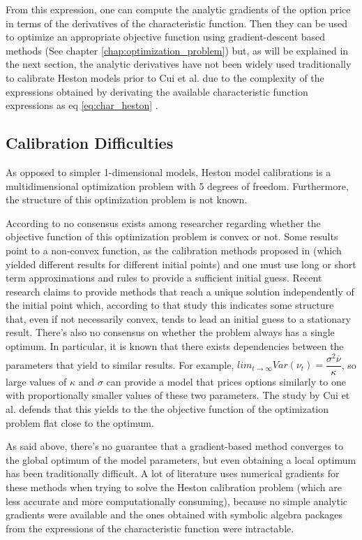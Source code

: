 \documentclass[12,twoside]{mammeTFM}
\theoremstyle{definition}
\theoremstyle{remark}
\begin{document}
From this expression, one can compute the analytic gradients of the option price in terms of the derivatives of the characteristic function. Then they can be used to optimize an appropriate objective function using gradient-descent based methods (See chapter \ref{chap:optimization_problem}) but, as will be explained in the next section, the analytic derivatives have not been widely used traditionally to calibrate Heston models prior to Cui et al. due to the complexity of the expressions obtained by derivating the available characteristic function expressions as eq \ref{eq:char_heston}  \cite{cui17}.

\subsection{Calibration Difficulties} \label{subsec:calibration_difficulties}
As opposed to simpler 1-dimensional models, Heston model calibrations is a multidimensional optimization problem with 5 degrees of freedom. Furthermore, the structure of this optimization problem is not known.

According to \cite{cui17} no consensus exists among researcher regarding whether the objective function of this optimization problem is convex or not. Some results point to a non-convex function, as the calibration methods proposed in \cite{che07, mik03} (which yielded different results for different initial points) and one must use long or short term approximations and rules to provide a sufficient initial guess. Recent research claims to provide methods that reach a unique solution independently of the initial point \cite{ger12} which, according to that study this indicates some structure that, even if not necessarily convex, tends to lead an initial guess to a stationary result.
There's also no consensus on whether the problem always has a single  optimum. In particular, it is known that there exists dependencies between the parameters that yield to similar results. For example, $lim_{t \rightarrow \infty} Var(\nu_t) = \dfrac{\sigma^2 \overline{\nu}}{\kappa}$, so large values of $\kappa$ and $\sigma$ can provide a model that prices options similarly to one with proportionally smaller values of these two parameters. The study by Cui et al. \cite{cui17} defends that this yields to the the objective function of the optimization problem flat close to the optimum.

As said above, there's no guarantee that a gradient-based method converges to the global optimum of the model parameters, but even obtaining a local optimum has been traditionally difficult. A lot of literature uses numerical gradients\cite{ger12} for these methods when trying to solve the Heston calibration problem (which are less accurate and more computationally consuming), because no simple analytic gradients were available and the ones obtained with symbolic algebra packages from the expressions of the characteristic function were intractable.
\end{document}
